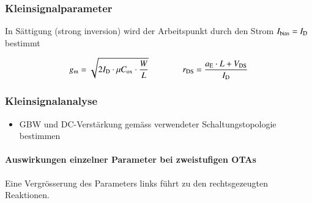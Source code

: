 \subsubsection{Kleinsignalparameter}

In Sättigung (strong inversion) wird der Arbeitspunkt durch den Strom $I_{\text{bias}} = I_{\rm D}$ bestimmt

\vspace{-0.1cm}

\[
    g_{\rm m} = \sqrt{2 I_\text{D} \cdot \mu C_\text{ox} \cdot \frac{W}{L}} \qquad \qquad
    r_{\rm DS} = \frac{a_{\rm E} \cdot L + V_\text{DS}}{I_\text{D}}
\]


\subsubsection{Kleinsignalanalyse}

\begin{itemize}
    \item GBW und DC-Verstärkung gemäss verwendeter Schaltungstopologie bestimmen
\end{itemize}

\smallskip

\paragraph{Auswirkungen einzelner Parameter bei zweistufigen OTAs}
Eine Vergrösserung des Parameters links führt zu den rechtsgezeugten Reaktionen.

\smallskip

